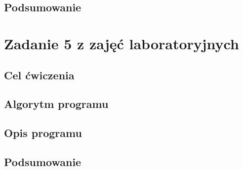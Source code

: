 \documentclass{mwart}
\begin{document}
		\subsection{Podsumowanie}
			\lipsum[1-8][2-8]	
	\section{Zadanie 5 z zajęć laboratoryjnych}
		\subsection{Cel ćwiczenia}
			\lipsum[1-8][2-8]
		\subsection{Algorytm programu}
			\lipsum[1-8][2-8]		
		\subsection{Opis programu}
			\lipsum[1-8][1-18]	
		\subsection{Podsumowanie}
			\lipsum[1-8][2-8]			
	
\end{document}
